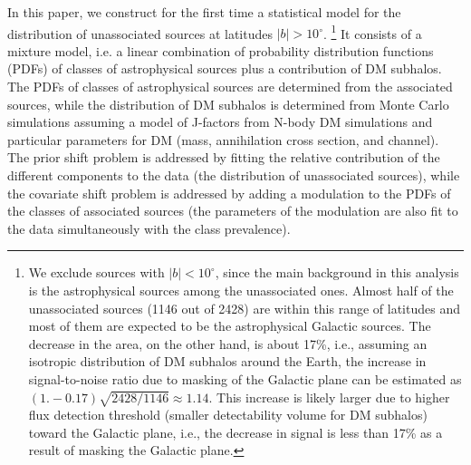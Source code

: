 \documentclass[12pt, a4paper]{article}
\begin{document}
In this paper, we construct for the first time a statistical model for the distribution of unassociated sources at latitudes $|b| > 10^\circ$.%
\footnote{We exclude sources with $|b| < 10^\circ$, since the main background in this analysis is the astrophysical sources among the unassociated ones. Almost half of the unassociated sources (1146 out of 2428) are within this range of latitudes and most of them are expected to be the astrophysical Galactic sources. The decrease in the area, on the other hand, is about 17\%, i.e., assuming an isotropic distribution of DM subhalos around the Earth, the increase in signal-to-noise ratio due to masking of the Galactic plane can be estimated as $ (1. - 0.17) \sqrt{2428/1146} \approx 1.14$.
This increase is likely larger due to higher flux detection threshold (smaller detectability volume for DM subhalos) toward the Galactic plane, i.e., the decrease in signal is less than 17\% as a result of masking the Galactic plane.
}
It consists of a mixture model, i.e. a linear combination of probability distribution functions (PDFs)
of classes of astrophysical sources plus a contribution of DM subhalos.
The PDFs of classes of astrophysical sources are determined from the associated sources, while the distribution of DM subhalos is determined from Monte Carlo simulations assuming a model of J-factors from N-body DM simulations and particular parameters for DM (mass, annihilation cross section, and channel).
The prior shift problem is addressed by fitting the relative contribution of the different components to the data (the distribution of unassociated sources), while the covariate shift problem is addressed by adding a modulation to the PDFs of the classes of associated sources (the parameters of the modulation are also fit to the data simultaneously with the class prevalence).
\end{document}
